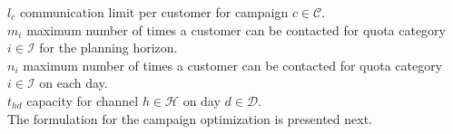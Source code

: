 \documentclass[11pt]{article}
\begin{document}
\noindent $l_{c}$ communication limit per customer for campaign $c \in \mathcal{C}$.\\

\noindent $m_{i}$ maximum number of times a customer can be contacted for quota category $i \in \mathcal{I}$ for the planning horizon.\\

\noindent $n_{i}$ maximum number of times a customer can be contacted for quota category $i \in \mathcal{I}$ on each day.\\

\noindent $t_{{h}{d}}$ capacity for channel $h \in \mathcal{H}$ on day $d \in \mathcal{D}$.\\

\noindent The formulation for the campaign optimization is presented next.
\end{document}
